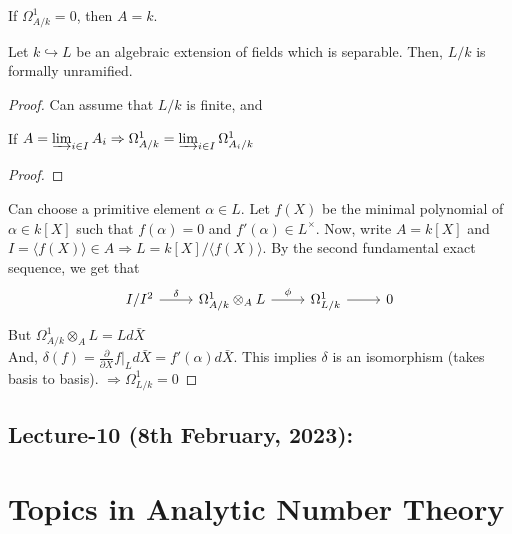 \documentclass[oneside, 12pt, ]{scrbook}
\newcommand{\ds}{\displaystyle}
\theoremstyle{theorem}
\begin{document}
\begin{corollary}
If $\Omega_{A/k}^{1} = 0$, then $A=k$.
\end{corollary}

\begin{lemma}
Let $k \hookrightarrow L$ be an algebraic extension of fields which is separable. Then, $L/k$ is formally unramified.
\end{lemma}

\begin{proof}
Can assume that $L/k$ is finite, and 
\begin{lemma}
If $A = \varinjlim_{i \in I} A_{i} \Rightarrow \Omega_{A/k}^{1} = \varinjlim_{i \in I} \Omega_{A_{i}/k}^{1}$
\end{lemma}

\begin{proof}

\end{proof}
Can choose a primitive element $\alpha \in L$. Let $f(X)$ be the minimal polynomial of $\alpha \in k[X]$ such that $f(\alpha)=0$ and $f'(\alpha) \in L^{\times}$. Now, write $A=k[X]$ and $I = \langle f(X)\rangle \in A \Rightarrow L = k[X]/ \langle f(X) \rangle$. By the second fundamental exact sequence, we get that 
\[\begin{tikzcd}
	{I/I^2} & {\Omega_{A/k}^{1} \otimes_{A} L} & {\Omega_{L/k}^{1}} & 0
	\arrow["\delta", from=1-1, to=1-2]
	\arrow["\phi", from=1-2, to=1-3]
	\arrow[from=1-3, to=1-4]
\end{tikzcd}\]
But $\Omega_{A/k}^{1} \otimes_{A} L = L d\bar{X}$ \\

And, $\delta(f) = \ds{\frac{\partial }{\partial X}f|_{L} d\bar{X}= f'(\alpha) d\bar{X}} $. This implies $\delta$ is an isomorphism (takes basis to basis). $\Rightarrow \Omega_{L/k}^{1} = 0$

\end{proof}


\chapter{Lecture-10 (8th February, 2023): }














\part{Topics in Analytic Number Theory}
\end{document}
